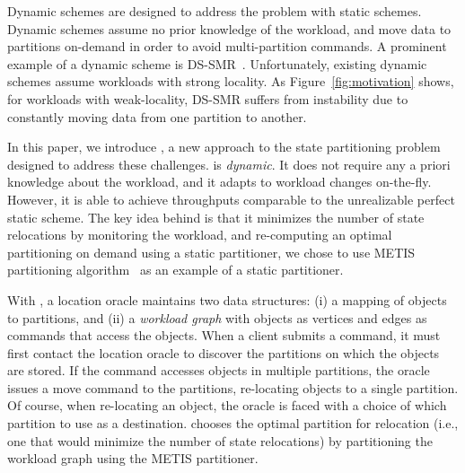 Dynamic schemes are designed to address the problem with static
schemes.  Dynamic schemes assume no prior knowledge of the workload,
and move data to partitions on-demand in order to avoid
multi-partition commands. A prominent example of a dynamic scheme is
DS-SMR~\cite{hoang2016}. Unfortunately, existing dynamic schemes assume
workloads with strong locality. As Figure~\ref{fig:motivation} shows,
for workloads with weak-locality, DS-SMR suffers from instability due
to constantly moving data from one partition to another.


In this paper, we introduce \dynastar, a new approach to the state
partitioning problem designed to address these challenges.  \dynastar
is \emph{dynamic}. It does not require any a priori knowledge about
the workload, and it adapts to workload changes on-the-fly. However,
it is able to achieve throughputs comparable to the unrealizable
perfect static scheme. The key idea behind \dynastar is that it
minimizes the number of state relocations by monitoring the workload,
and re-computing an optimal partitioning on demand using a static
partitioner, we chose to use METIS partitioning algorithm~\cite{Abou-Rjeili:2006}
as an example of a static partitioner.


With \dynastar, a location oracle maintains two data structures: (i) a
mapping of objects to partitions, and (ii) a \emph{workload graph}
with objects as vertices and edges as commands that access the
objects.  When a client submits a command, it must first contact the
location oracle to discover the partitions on which the objects are
stored.  If the command accesses objects in multiple partitions, the
oracle issues a move command to the partitions, re-locating objects to
a single partition. Of course, when re-locating an object, the oracle
is faced with a choice of which partition to use as a destination.
\dynastar chooses the optimal partition for relocation (i.e., one that
would minimize the number of state relocations) by partitioning the workload graph
using the METIS partitioner.

